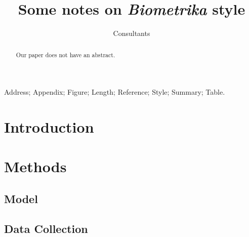 \documentclass[lineno]{biometrika}
\begin{document}



\title{Some notes on \textit{Biometrika} style}

\author{Consultants}



\maketitle

\begin{abstract}
Our paper does not have an abstract. 
\end{abstract}

\begin{keywords}
Address; Appendix; Figure; Length; Reference; Style; Summary; Table.
\end{keywords}

\section{Introduction}

\lipsum[1-2]


\section{Methods}

\lipsum[3]


\subsection{Model}

\lipsum[10-11]

\subsection{Data Collection}
\end{document}
